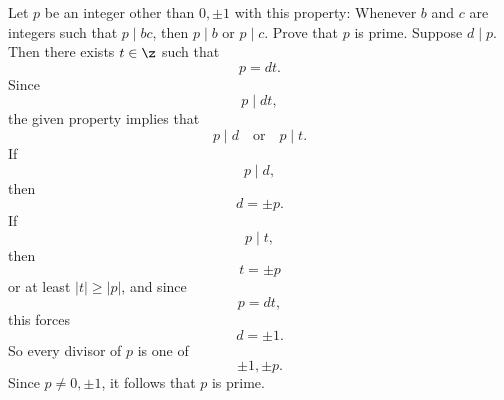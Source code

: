 \begin{problem}{
    Let $p$ be an integer other than $0,\pm 1$ with this property:
    Whenever $b$ and $c$ are integers such that $p\mid bc$, then $p\mid b$ or $p\mid c$.
    Prove that $p$ is prime.
}
    Suppose $d\mid p$.
    Then there exists $t\in\z$ such that
    \[
        p=dt.
    \]
    Since
    \[
        p\mid dt,
    \]
    the given property implies that
    \[
        p\mid d
        \quad\text{or}\quad
        p\mid t.
    \]
    If
    \[
        p\mid d,
    \]
    then
    \[
        d=\pm p.
    \]
    If
    \[
        p\mid t,
    \]
    then
    \[
        t=\pm p
    \]
    or at least $|t|\geq |p|$, and since
    \[
        p=dt,
    \]
    this forces
    \[
        d=\pm 1.
    \]
    So every divisor of $p$ is one of
    \[
        \pm 1,\pm p.
    \]
    Since $p\neq 0,\pm 1$, it follows that $p$ is prime.
\end{problem}

